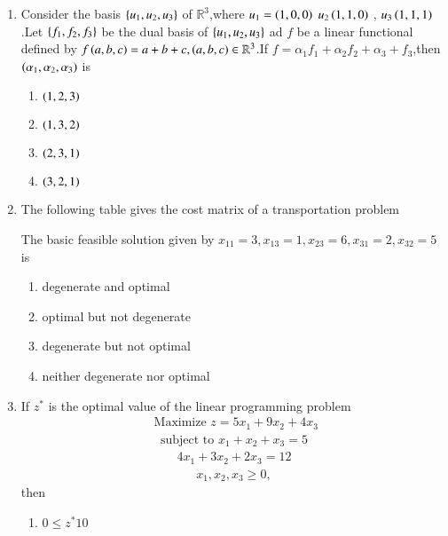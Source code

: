 \documentclass[journal,12pt,onecolumn]{IEEEtran}
\theoremstyle{remark}
\begin{document}
\begin{enumerate}
  \item Consider the basis $\left\{u_1,u_2,u_3\right\}$ of $\mathbb{R}^3$,where $u_1 = \left(1,0,0\right)$ $u_2\left(1,1,0\right)$ , $u_3\left(1,1,1\right)$.Let $\left\{f_1,f_2,f_3\right\}$ be the dual basis of $\left\{u_1,u_2,u_3\right\}$ ad $f$ be a linear functional defined by $f\left(a,b,c\right) = a+b+c , \left(a,b,c\right)\in\mathbb{R}^3$.If $f = \alpha_1f_1+\alpha_2f_2+\alpha_3+f_3$,then $\left(\alpha_1,\alpha_2,\alpha_3\right)$ is
  \begin{multicols}{4}
      \begin{enumerate}
          \item $\left(1,2,3\right)$
          \item $\left(1,3,2\right)$
          \item $\left(2,3,1\right)$
          \item $\left(3,2,1\right)$
      \end{enumerate}
  \end{multicols}
  \item The following table gives the cost matrix of a transportation problem
\begin{table}[h!]    
        \centering
        
    \end{table}
  The basic feasible solution given by $x_{11} =3 , x_{13}=1 , x_{23} =6,x_{31}=2,x_{32}=5$ is
  \begin{enumerate}
      \item degenerate and optimal
      \item optimal but not degenerate
      \item degenerate but not optimal
      \item neither degenerate nor optimal
  \end{enumerate}
  \item If $z^*$ is the optimal value of the linear programming problem
  \begin{align}
      \text{ Maximize } z = 5x_1 + 9x_2 + 4x_3
  \end{align}
  \begin{align}
      \text{subject to } x_1 + x_2 + x_3 =5 
  \end{align}
  \begin{align}
      4x_1 + 3x_2 + 2x_3 = 12
  \end{align}
  \begin{align}
      x_1,x_2,x_3\geq 0,
  \end{align}
  then 
  \begin{enumerate}
      \item $0\leq z^* 10$

\end{enumerate}
\end{enumerate}
\end{document}
